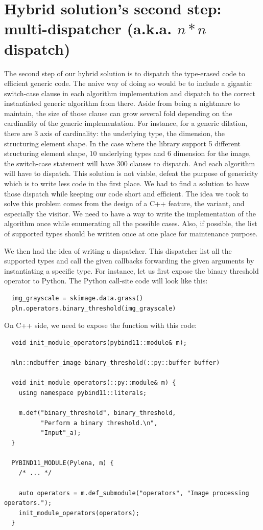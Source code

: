 \section{Hybrid solution's second step: multi-dispatcher (a.k.a. $n*n$ dispatch)}

The second step of our hybrid solution is to dispatch the type-erased code to efficient generic code. The naive way of
doing so would be to include a gigantic switch-case clause in each algorithm implementation and dispatch to the correct
instantiated generic algorithm from there. Aside from being a nightmare to maintain, the size of those clause can grow
several fold depending on the cardinality of the generic implementation. For instance, for a generic dilation, there are
3 axis of cardinality: the underlying type, the dimension, the structuring element shape. In the case where the library
support 5 different structuring element shape, 10 underlying types and 6 dimension for the image, the switch-case
statement will have 300 clauses to dispatch. And each algorithm will have to dispatch. This solution is not viable,
defeat the purpose of genericity which is to write less code in the first place. We had to find a solution to have those
dispatch while keeping our code short and efficient. The idea we took to solve this problem comes from the design of a
C++ feature, the variant, and especially the visitor. We need to have a way to write the implementation of the algorithm
once while enumerating all the possible cases. Also, if possible, the list of supported types should be written once at
one place for maintenance purpose.

We then had the idea of writing a dispatcher. This dispatcher list all the supported types and call the given callbacks
forwarding the given arguments by instantiating a specific type. For instance, let us first expose the binary threshold
operator to Python. The Python call-site code will look like this:

\begin{verbatim}
  img_grayscale = skimage.data.grass()
  pln.operators.binary_threshold(img_grayscale)
\end{verbatim}

On C++ side, we need to expose the function with this code:
\begin{verbatim}
  void init_module_operators(pybind11::module& m);

  mln::ndbuffer_image binary_threshold(::py::buffer buffer)

  void init_module_operators(::py::module& m) {
    using namespace pybind11::literals;

    m.def("binary_threshold", binary_threshold,
          "Perform a binary threshold.\n",
          "Input"_a);
  }

  PYBIND11_MODULE(Pylena, m) {
    /* ... */

    auto operators = m.def_submodule("operators", "Image processing operators.");
    init_module_operators(operators);
  }
\end{verbatim}

